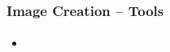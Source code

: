 \begin{frame}
\frametitle{Image Creation -- Tools}
\framesubtitle{}
\begin{itemize}
\item 
\end{itemize}
\end{frame}

